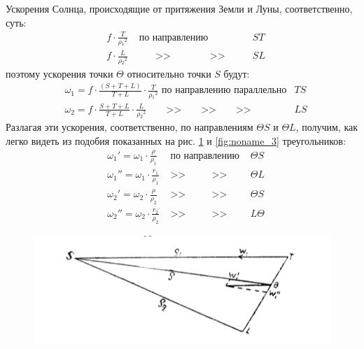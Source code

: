 \documentclass[a4paper,12pt]{book}
\begin{document}
Ускорения Солнца, происходящие от притяжения Земли и Луны, соответственно, суть:
%
\begin{equation*}
\begin{aligned}
	& f\cdot\frac{T}{\rho{_1}^2} & \text{ по направлению } & ST
	\\
	& f\cdot\frac{L}{\rho{_2}^2} & \qquad\text{>>} \qquad\qquad\text{>>} \qquad & SL
\end{aligned}
\end{equation*}
%
поэтому ускорения точки $\Theta$ относительно точки $S$ будут:
%
\begin{equation*}
\begin{aligned}
	& \omega_1=f \cdot \frac{\left(S+T+L\right)}{T+L} \cdot \frac{T}{\rho{_1}^2} \text{ по направлению параллельно} & TS
	\\
	& \omega_2=f \cdot \frac{S+T+L}{T+L} \cdot \frac{L}{\rho{_2}^2} \qquad\text{>>} \qquad\text{>>} \qquad\text{>>} & LS
\end{aligned}
\end{equation*}
%
Разлагая эти ускорения, соответственно, по направлениям $\Theta S$ и $\Theta L$, получим, как легко видеть из подобия показанных на рис. \ref{fig:noname_2} и \ref{fig:noname_3} треугольников:
%
\begin{equation*}
\begin{aligned}
	& \omega_1' = \omega_1 \cdot \frac{\rho}{\rho_1} & \text{ по направлению } & \Theta S
	\\
	& \omega_1'' = \omega_1 \cdot \frac{r_1}{\rho_1} & \text{ >> } \qquad \text{ >> } & \Theta L
	\\
	& \omega_2' = \omega_2 \cdot \frac{\rho}{\rho_2} & \text{ >> } \qquad \text{ >> } & \Theta S
	\\
	& \omega_2'' = \omega_2 \cdot \frac{r_2}{\rho_2} & \text{ >> } \qquad \text{ >> } & L \Theta
\end{aligned}
\end{equation*}
%
\begin{figure}[H]
	\centering
	\includegraphics{22.png}
	\caption{}
	\label{fig:noname_2}
\end{figure}
\end{document}
